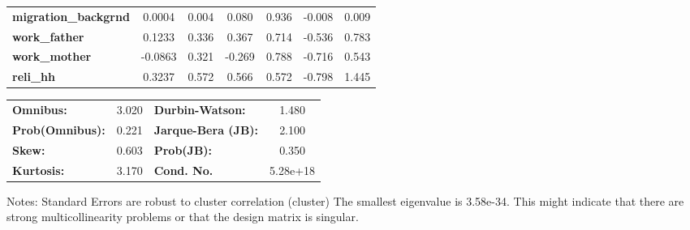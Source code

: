 \begin{center}
\begin{tabular}{lcccccc}
\textbf{migration\_backgrnd}             &       0.0004  &        0.004     &     0.080  &         0.936        &       -0.008    &        0.009     \\
\textbf{work\_father}                    &       0.1233  &        0.336     &     0.367  &         0.714        &       -0.536    &        0.783     \\
\textbf{work\_mother}                    &      -0.0863  &        0.321     &    -0.269  &         0.788        &       -0.716    &        0.543     \\
\textbf{reli\_hh}                        &       0.3237  &        0.572     &     0.566  &         0.572        &       -0.798    &        1.445     \\
\bottomrule
\end{tabular}
\begin{tabular}{lclc}
\textbf{Omnibus:}       &  3.020 & \textbf{  Durbin-Watson:     } &    1.480  \\
\textbf{Prob(Omnibus):} &  0.221 & \textbf{  Jarque-Bera (JB):  } &    2.100  \\
\textbf{Skew:}          &  0.603 & \textbf{  Prob(JB):          } &    0.350  \\
\textbf{Kurtosis:}      &  3.170 & \textbf{  Cond. No.          } & 5.28e+18  \\
\bottomrule
\end{tabular}
\end{center}

Notes: \newline
 [1] Standard Errors are robust to cluster correlation (cluster) \newline
 [2] The smallest eigenvalue is 3.58e-34. This might indicate that there are \newline
 strong multicollinearity problems or that the design matrix is singular.
